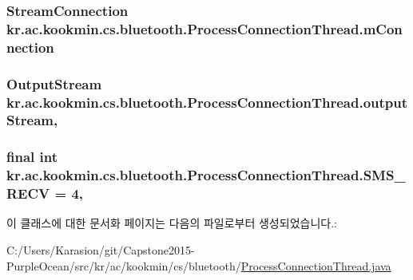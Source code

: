 \subsubsection[{m\+Connection}]{\setlength{\rightskip}{0pt plus 5cm}Stream\+Connection kr.\+ac.\+kookmin.\+cs.\+bluetooth.\+Process\+Connection\+Thread.\+m\+Connection\hspace{0.3cm}{\ttfamily [private]}}\label{classkr_1_1ac_1_1kookmin_1_1cs_1_1bluetooth_1_1_process_connection_thread_a3279e43af243928d3eafa90238198fc1}
\hypertarget{classkr_1_1ac_1_1kookmin_1_1cs_1_1bluetooth_1_1_process_connection_thread_ab283f9949cd2d643769616474eecba8c}{}
\subsubsection[{output\+Stream}]{\setlength{\rightskip}{0pt plus 5cm}Output\+Stream kr.\+ac.\+kookmin.\+cs.\+bluetooth.\+Process\+Connection\+Thread.\+output\+Stream\hspace{0.3cm}{\ttfamily [static]}, {\ttfamily [private]}}\label{classkr_1_1ac_1_1kookmin_1_1cs_1_1bluetooth_1_1_process_connection_thread_ab283f9949cd2d643769616474eecba8c}
\hypertarget{classkr_1_1ac_1_1kookmin_1_1cs_1_1bluetooth_1_1_process_connection_thread_ad4414914d0f4597985a7d5d9a393dbe8}{}
\subsubsection[{S\+M\+S\+\_\+\+R\+E\+C\+V}]{\setlength{\rightskip}{0pt plus 5cm}final int kr.\+ac.\+kookmin.\+cs.\+bluetooth.\+Process\+Connection\+Thread.\+S\+M\+S\+\_\+\+R\+E\+C\+V = 4\hspace{0.3cm}{\ttfamily [static]}, {\ttfamily [private]}}\label{classkr_1_1ac_1_1kookmin_1_1cs_1_1bluetooth_1_1_process_connection_thread_ad4414914d0f4597985a7d5d9a393dbe8}


이 클래스에 대한 문서화 페이지는 다음의 파일로부터 생성되었습니다.\+:\begin{DoxyCompactItemize}
\item 
C\+:/\+Users/\+Karasion/git/\+Capstone2015-\/\+Purple\+Ocean/src/kr/ac/kookmin/cs/bluetooth/\hyperlink{_process_connection_thread_8java}{Process\+Connection\+Thread.\+java}\end{DoxyCompactItemize}
